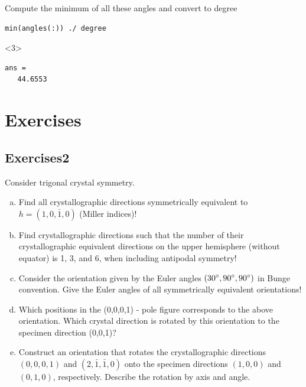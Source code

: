 \documentclass[compress]{beamer}
\begin{document}
\begin{frame}[fragile]
\begin{overlayarea}{\textwidth}{8cm}
  Compute the minimum of all these angles and convert to degree
   \begin{lstlisting}[style=input]
min(angles(:)) ./ degree
   \end{lstlisting}
   \begin{onlyenv}<3>
     \vspace{-.3cm}
     \begin{lstlisting}[style=output]
ans =
   44.6553
     \end{lstlisting}
   \end{onlyenv}
 \end{overlayarea}
\end{frame}

\section{Exercises}

\subsection*{Exercises2}

\begin{frame}

  \begin{Exercise}
    Consider trigonal crystal symmetry.

  \begin{enumerate}[a)]
    \item Find all crystallographic directions symmetrically equivalent to $h
      = (1, 0, \bar 1, 0)$ (Miller indices)!
    \item Find crystallographic directions such that the number of their
      crystallographic equivalent directions on the upper hemisphere (without
      equator) is 1, 3, and 6, when including antipodal symmetry!
    \item Consider the orientation given by the Euler angles $(30^\circ,
      90^\circ, 90^\circ)$ in Bunge convention. Give the Euler angles of
      all symmetrically equivalent orientations!
    \item Which positions in the (0,0,0,1) - pole figure corresponds to the
      above orientation. Which crystal direction is rotated by this
      orientation to the specimen direction (0,0,1)?
    \item Construct an orientation that rotates the crystallographic
      directions $(0,0,0,1)$ and $(2,\bar 1,\bar 1,0)$ onto the specimen
      directions $(1,0,0)$ and $(0,1,0)$, respectively. Describe the rotation
      by axis and angle.
    \end{enumerate}

  \end{Exercise}

\end{frame}
\end{document}
